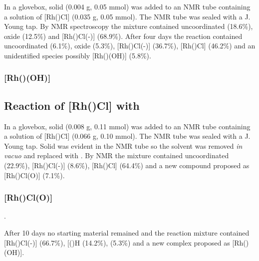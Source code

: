 
In a glovebox, solid  (0.004 g, 0.05 mmol) was added to an NMR tube containing a  solution of [Rh(\tBusixantphos)Cl] (0.035 g, 0.05 mmol).  The NMR tube was sealed with a J. Young tap.  By \phosphorus{} NMR spectroscopy the mixture contained uncoordinated \tBusixantphos{} (18.6\%), \tBusixantphos{} oxide (12.5\%) and [Rh(\tBusixantphos)Cl(-)] (68.9\%).  After four days the reaction contained uncoordinated \tBusixantphos{} (6.1\%), \tBusixantphos{} oxide (5.3\%), [Rh(\tBusixantphos)Cl(-)] (36.7\%),  [Rh(\tBusixantphos)Cl] (46.2\%) and an unidentified species possibly [Rh(\tBusixantphos)(OH)] (5.8\%).

\subsubsection{[Rh(\tBusixantphos)(OH)]}


\subsection*{Reaction of [Rh(\tButhixantphos)Cl] with \texorpdfstring{} O}

In a glovebox, solid  (0.008 g, 0.11 mmol) was added to an NMR tube containing a  solution of [Rh(\tButhixantphos)Cl] (0.066 g, 0.10 mmol).  The NMR tube was sealed with a J. Young tap.  Solid was evident in the NMR tube so the solvent was removed \emph{in vacuo} and replaced with .  By \phosphorus{} NMR the mixture contained uncoordinated \tButhixantphos{} (22.9\%), [Rh(\tButhixantphosk)Cl(-)] (8.6\%), [Rh(\tButhixantphosk)Cl] (64.4\%) and a new compound proposed as [Rh(\tButhixantphosk)Cl(O)] (7.1\%).

\subsubsection{[Rh(\tButhixantphosk)Cl(O)]}

.

After 10 days no starting material remained and the reaction mixture contained [Rh(\tButhixantphosk)Cl(-)] (66.7\%), [(\tButhixantphos)H\ce{]+} (14.2\%), \tButhixantphos{} (5.3\%) and a new complex proposed as [Rh(\tButhixantphos)\-(OH)].

